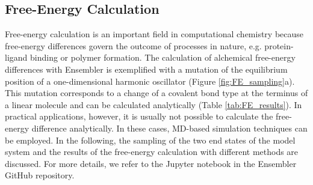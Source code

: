 \FloatBarrier
\clearpage

\subsection{Free-Energy Calculation}

Free-energy calculation is an important field in computational chemistry because free-energy differences govern the outcome of processes in nature, e.g. protein-ligand binding or polymer formation.\cite{Christ2009, Hansen2014, Cournia2020, Armacost2020} 
%
The calculation of alchemical free-energy differences with Ensembler is exemplified with a mutation of the equilibrium position of a one-dimensional harmonic oscillator (Figure \ref{fig:FE_sampling}a).
This mutation corresponds to a change of a covalent bond type at the terminus of a linear molecule and can be calculated analytically (Table \ref{tab:FE_results}).
In practical applications, however, it is usually not possible to calculate the free-energy difference analytically. In these cases, MD-based simulation techniques can be employed.
In the following, the sampling of the two end states of the model system and the results of the free-energy calculation with different methods are discussed. For more details, we refer to the Jupyter notebook in the Ensembler GitHub repository.

